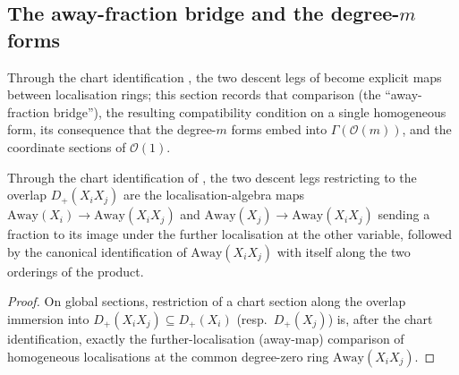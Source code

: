\subsection{The away-fraction bridge and the degree-\(m\) forms}
\label{subsec:serre_twist_away_bridge}

Through the chart identification , the two
descent legs of  become explicit
maps between localisation rings; this section records that comparison
(the ``away-fraction bridge''), the resulting compatibility condition on a
single homogeneous form, its consequence that the degree-\(m\) forms embed
into \(\Gamma(\mathcal O(m))\), and the coordinate sections of
\(\mathcal O(1)\).

\begin{lemma}\leanok
  \label{lem:serre_twist_away_bridge}
  Through the chart identification of , the
  two descent legs restricting to the overlap \(D_+(X_i X_j)\) are the
  localisation-algebra maps \(\mathrm{Away}(X_i) \to \mathrm{Away}(X_i X_j)\)
  and \(\mathrm{Away}(X_j) \to \mathrm{Away}(X_i X_j)\) sending a fraction to
  its image under the further localisation at the other variable, followed
  by the canonical identification of \(\mathrm{Away}(X_i X_j)\) with itself
  along the two orderings of the product.
\end{lemma}
\begin{proof}\leanok
  On global sections, restriction of a chart section along the overlap
  immersion into \(D_+(X_i X_j) \subseteq D_+(X_i)\) (resp.\ \(D_+(X_j)\)) is,
  after the chart identification, exactly the further-localisation
  (away-map) comparison of homogeneous localisations at the common
  degree-zero ring \(\mathrm{Away}(X_i X_j)\).
\end{proof}

